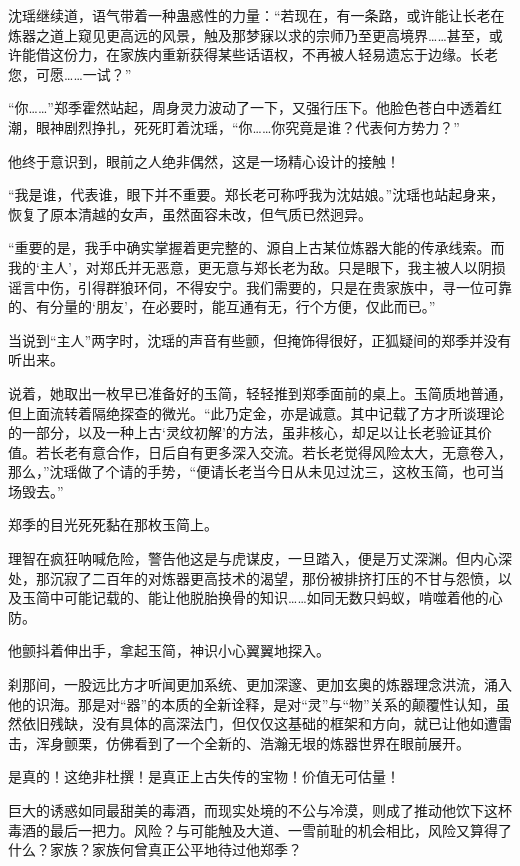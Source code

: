沈瑶继续道，语气带着一种蛊惑性的力量：“若现在，有一条路，或许能让长老在炼器之道上窥见更高远的风景，触及那梦寐以求的宗师乃至更高境界……甚至，或许能借这份力，在家族内重新获得某些话语权，不再被人轻易遗忘于边缘。长老您，可愿……一试？”

“你……”郑季霍然站起，周身灵力波动了一下，又强行压下。他脸色苍白中透着红潮，眼神剧烈挣扎，死死盯着沈瑶，“你……你究竟是谁？代表何方势力？”

他终于意识到，眼前之人绝非偶然，这是一场精心设计的接触！

“我是谁，代表谁，眼下并不重要。郑长老可称呼我为沈姑娘。”沈瑶也站起身来，恢复了原本清越的女声，虽然面容未改，但气质已然迥异。

“重要的是，我手中确实掌握着更完整的、源自上古某位炼器大能的传承线索。而我的‘主人’，对郑氏并无恶意，更无意与郑长老为敌。只是眼下，我主被人以阴损谣言中伤，引得群狼环伺，不得安宁。我们需要的，只是在贵家族中，寻一位可靠的、有分量的‘朋友’，在必要时，能互通有无，行个方便，仅此而已。”

当说到“主人”两字时，沈瑶的声音有些颤，但掩饰得很好，正狐疑间的郑季并没有听出来。

说着，她取出一枚早已准备好的玉简，轻轻推到郑季面前的桌上。玉简质地普通，但上面流转着隔绝探查的微光。“此乃定金，亦是诚意。其中记载了方才所谈理论的一部分，以及一种上古‘灵纹初解’的方法，虽非核心，却足以让长老验证其价值。若长老有意合作，日后自有更多深入交流。若长老觉得风险太大，无意卷入，那么，”沈瑶做了个请的手势，“便请长老当今日从未见过沈三，这枚玉简，也可当场毁去。”

郑季的目光死死黏在那枚玉简上。

理智在疯狂呐喊危险，警告他这是与虎谋皮，一旦踏入，便是万丈深渊。但内心深处，那沉寂了二百年的对炼器更高技术的渴望，那份被排挤打压的不甘与怨愤，以及玉简中可能记载的、能让他脱胎换骨的知识……如同无数只蚂蚁，啃噬着他的心防。

他颤抖着伸出手，拿起玉简，神识小心翼翼地探入。

刹那间，一股远比方才听闻更加系统、更加深邃、更加玄奥的炼器理念洪流，涌入他的识海。那是对“器”的本质的全新诠释，是对“灵”与“物”关系的颠覆性认知，虽然依旧残缺，没有具体的高深法门，但仅仅这基础的框架和方向，就已让他如遭雷击，浑身颤栗，仿佛看到了一个全新的、浩瀚无垠的炼器世界在眼前展开。

是真的！这绝非杜撰！是真正上古失传的宝物！价值无可估量！

巨大的诱惑如同最甜美的毒酒，而现实处境的不公与冷漠，则成了推动他饮下这杯毒酒的最后一把力。风险？与可能触及大道、一雪前耻的机会相比，风险又算得了什么？家族？家族何曾真正公平地待过他郑季？

